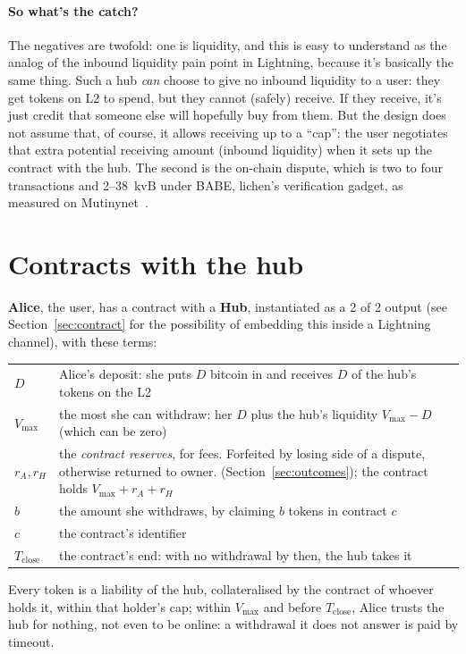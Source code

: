 \documentclass[11pt]{article}
\newcommand{\vmax}{V_{\max}}
\newcommand{\Tc}{T_{\mathrm{close}}}
\begin{document}
\paragraph{So what's the catch?} The negatives are twofold: one is liquidity, and this is easy to understand as the analog of the inbound liquidity pain point in Lightning, because it's basically the same thing. Such a hub \emph{can} choose to give no inbound liquidity to a user: they get tokens on L2 to spend, but they cannot (safely) receive. If they receive, it's just credit that someone else will hopefully buy from them. But the design does not assume that, of course, it allows receiving up to a ``cap'': the user negotiates that extra potential receiving amount (inbound liquidity) when it sets up the contract with the hub. The second is the on-chain dispute, which is two to four transactions and 2--38~kvB under BABE, lichen's verification gadget, as measured on Mutinynet~\cite{lichenl2}.

\section{Contracts with the hub}
\label{sec:terms}

\textbf{Alice}, the user, has a contract with a \textbf{Hub}, instantiated as a 2 of 2 output  (see Section~\ref{sec:contract} for the possibility of embedding this inside a Lightning channel), with these terms:
\begin{center}
\small
\begin{tabularx}{\linewidth}{p{16mm}L}
\toprule
$D$ & Alice's deposit: she puts $D$ bitcoin in and receives $D$ of the hub's tokens on the L2 \\
$\vmax$ & the most she can withdraw: her $D$ plus the hub's liquidity $\vmax - D$ (which can be zero)\footnotemark\\
$r_A, r_H$ & the \emph{contract reserves}, for fees. Forfeited by losing side of a dispute, otherwise returned to owner. (Section~\ref{sec:outcomes}); the contract holds $\vmax + r_A + r_H$ \\
$b$ & the amount she withdraws, by claiming $b$ tokens in contract $c$ \\
$c$ & the contract's identifier \\
$\Tc$ & the contract's end: with no withdrawal by then, the hub takes it \\
\bottomrule
\end{tabularx}
\end{center}
Every token is a liability of the hub, collateralised by the contract of whoever holds it, within that holder's cap; within $\vmax$ and before $\Tc$, Alice trusts the hub for nothing, not even to be online: a withdrawal it does not answer is paid by timeout.
\end{document}
